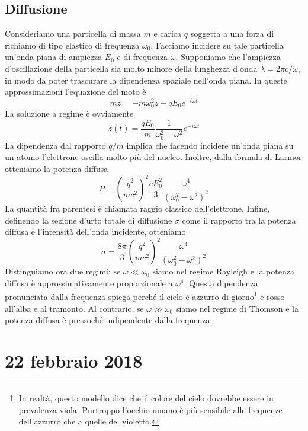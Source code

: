 \documentclass[a4paper,11pt]{book}
\theoremstyle{theorem}
\theoremstyle{definition}
\begin{document}
\subsection{Diffusione}
Consideriamo una particella di massa $m$ e carica $q$ soggetta a una forza di richiamo di tipo elastico di frequenza $\omega_0$. Facciamo incidere su tale particella un'onda piana di ampiezza $E_0$ e di frequenza $\omega$. Supponiamo che l'ampiezza d'oscillazione della particella sia molto minore della lunghezza d'onda $\lambda=2\pi c/\omega$, in modo da poter trascurare la dipendenza spaziale nell'onda piana. In queste approssimazioni l'equazione del moto è
\[m\ddot{z}=-m\omega_0^2z+qE_0e^{-i\omega t}\]
La soluzione a regime è ovviamente
\[z(t)=\frac{qE_0}{m}\frac{1}{\omega_0^2-\omega^2}e^{-i\omega t}\]
La dipendenza dal rapporto $q/m$ implica che facendo incidere un'onda piana su un atomo l'elettrone oscilla molto più del nucleo. Inoltre, dalla formula di Larmor otteniamo la potenza diffusa
\[P=\left(\frac{q^2}{mc^2}\right)^2\frac{cE_0^2}{3}\frac{\omega^4}{(\omega_0^2-\omega^2)^2}\]
La quantità fra parentesi è chiamata raggio classico dell'elettrone. Infine, definendo la sezione d'urto totale di diffusione $\sigma$ come il rapporto tra la potenza diffusa e l'intensità dell'onda incidente, otteniamo
\[\sigma=\frac{8\pi}{3}\left(\frac{q^2}{mc^2}\right)^2\frac{\omega^4}{(\omega_0^2-\omega^2)^2}\]
Distinguiamo ora due regimi: se $\omega\ll\omega_0$ siamo nel regime Rayleigh e la potenza diffusa è approssimativamente proporzionale a $\omega^4$. Questa dipendenza pronunciata dalla frequenza spiega perché il cielo è azzurro di giorno\footnote{In realtà, questo modello dice che il colore del cielo dovrebbe essere in prevalenza viola. Purtroppo l'occhio umano è più sensibile alle frequenze dell'azzurro che a quelle del violetto.} e rosso all'alba e al tramonto. Al contrario, se $\omega\gg\omega_0$ siamo nel regime di Thomson e la potenza diffusa è pressoché indipendente dalla frequenza.
\newpage
\section{22 febbraio 2018}
\end{document}
